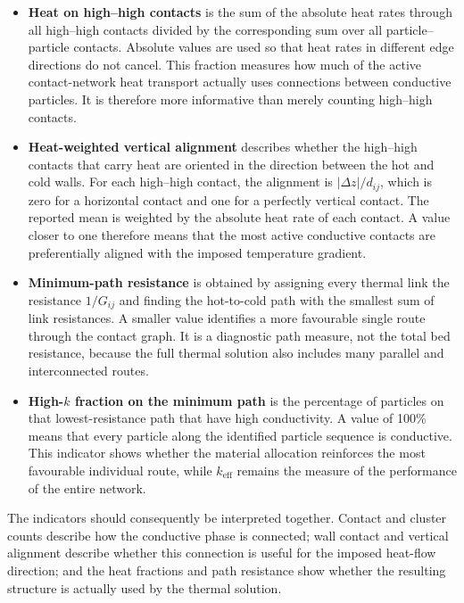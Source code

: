 \documentclass[12pt,a4paper]{article}
\begin{document}
\begin{itemize}
		\item \textbf{Heat on high--high contacts} is the sum of the absolute heat
		rates through all high--high contacts divided by the corresponding sum over
		all particle--particle contacts. Absolute values are used so that heat rates
		in different edge directions do not cancel. This fraction measures how much
		of the active contact-network heat transport actually uses connections between
		conductive particles. It is therefore more informative than merely counting
		high--high contacts.
		
		\item \textbf{Heat-weighted vertical alignment} describes whether the
		high--high contacts that carry heat are oriented in the direction between the
		hot and cold walls. For each high--high contact, the alignment is
		$|\Delta z|/d_{ij}$, which is zero for a horizontal contact and one for a
		perfectly vertical contact. The reported mean is weighted by the absolute
		heat rate of each contact. A value closer to one therefore means that the most
		active conductive contacts are preferentially aligned with the imposed
		temperature gradient.
		
		\item \textbf{Minimum-path resistance} is obtained by assigning every thermal
		link the resistance $1/G_{ij}$ and finding the hot-to-cold path with the
		smallest sum of link resistances. A smaller value identifies a more favourable
		single route through the contact graph. It is a diagnostic path measure, not
		the total bed resistance, because the full thermal solution also includes many
		parallel and interconnected routes.
		
		\item \textbf{High-$k$ fraction on the minimum path} is the percentage of
		particles on that lowest-resistance path that have high conductivity. A value
		of 100\% means that every particle along the identified particle sequence is
		conductive. This indicator shows whether the material allocation reinforces
		the most favourable individual route, while $k_{\mathrm{eff}}$ remains the
		measure of the performance of the entire network.
	\end{itemize}
	
	The indicators should consequently be interpreted together. Contact and
	cluster counts describe how the conductive phase is connected; wall contact
	and vertical alignment describe whether this connection is useful for the
	imposed heat-flow direction; and the heat fractions and path resistance show
	whether the resulting structure is actually used by the thermal solution.
	
\end{document}
